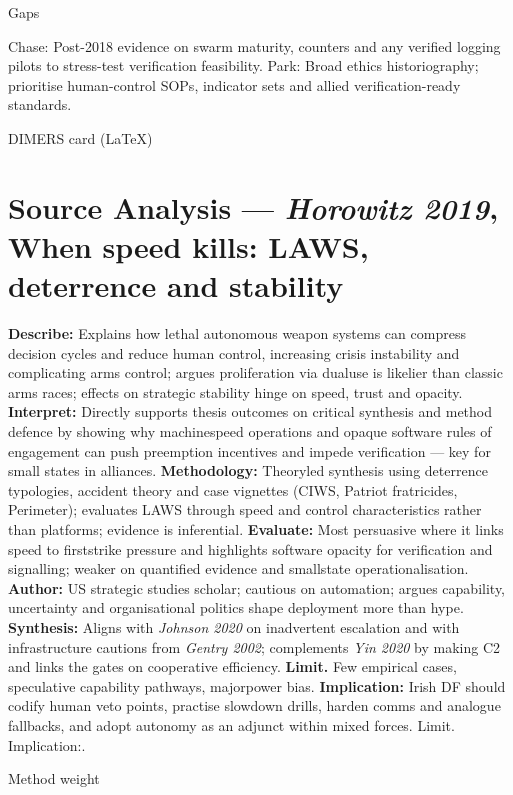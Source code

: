 Gaps

Chase: Post-2018 evidence on swarm maturity, counters and any verified logging pilots to stress-test verification feasibility.
Park: Broad ethics historiography; prioritise human-control SOPs, indicator sets and allied verification-ready standards.


\parencite{HOROWITZ_2019}

DIMERS card (LaTeX)

\section*{Source Analysis — \textit{Horowitz 2019}, When speed kills: LAWS, deterrence and stability}
\textbf{Describe:} Explains how lethal autonomous weapon systems can compress decision cycles and reduce human control, increasing crisis instability and complicating arms control; argues proliferation via dual\textendash use is likelier than classic arms races; effects on strategic stability hinge on speed, trust and opacity.
\textbf{Interpret:} Directly supports thesis outcomes on critical synthesis and method defence by showing why machine\textendash speed operations and opaque software rules of engagement can push pre\textendash emption incentives and impede verification — key for small states in alliances.
\textbf{Methodology:} Theory\textendash led synthesis using deterrence typologies, accident theory and case vignettes (CIWS, Patriot fratricides, Perimeter); evaluates LAWS through speed and control characteristics rather than platforms; evidence is inferential.
\textbf{Evaluate:} Most persuasive where it links speed to first\textendash strike pressure and highlights software opacity for verification and signalling; weaker on quantified evidence and small\textendash state operationalisation.
\textbf{Author:} US strategic studies scholar; cautious on automation; argues capability, uncertainty and organisational politics shape deployment more than hype.
\textbf{Synthesis:} Aligns with \textit{Johnson 2020} on inadvertent escalation and with infrastructure cautions from \textit{Gentry 2002}; complements \textit{Yin 2020} by making C2 and links the gates on cooperative efficiency.
\textbf{Limit.} Few empirical cases, speculative capability pathways, major\textendash power bias.
\textbf{Implication:} Irish DF should codify human veto points, practise slow\textendash down drills, harden comms and analogue fallbacks, and adopt autonomy as an adjunct within mixed forces. Limit. Implication:.

Method weight

